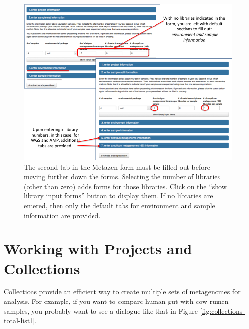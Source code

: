 \documentclass[12pt,fullpage]{report}
\begin{document}
\begin{figure}
\begin{center}
\includegraphics[width=6in]{Images/metazen_step2.png}
\end{center} 
\caption{The second tab in the Metazen form must be filled out before moving further down the forms. Selecting the number of libraries (other than zero) adds forms for those libraries. Click on the “show library input forms” button to display them. If no libraries are entered, then only the default tabs for environment and sample information are provided.}
\label{fig:metazen_step2}
\end{figure}


 \section{Working with Projects and Collections}

Collections provide an efficient way to create multiple sets of metagenomes for analysis. For example, if you want to compare human gut with cow rumen samples, you probably want to see a dialogue like that in Figure \ref{fig:collections-total-list1}.
\end{document}

